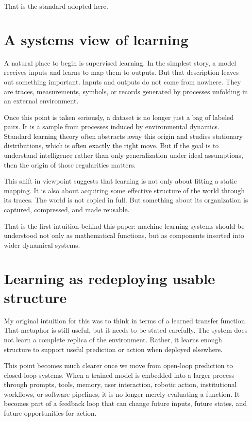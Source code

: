 \documentclass[11pt]{article}
\begin{document}
That is the standard adopted here.

\section{A systems view of learning}

A natural place to begin is supervised learning. In the simplest story, a model receives inputs and learns to map them to outputs. But that description leaves out something important. Inputs and outputs do not come from nowhere. They are traces, measurements, symbols, or records generated by processes unfolding in an external environment.

Once this point is taken seriously, a dataset is no longer just a bag of labeled pairs. It is a sample from processes induced by environmental dynamics. Standard learning theory often abstracts away this origin and studies stationary distributions, which is often exactly the right move. But if the goal is to understand intelligence rather than only generalization under ideal assumptions, then the origin of those regularities matters.

This shift in viewpoint suggests that learning is not only about fitting a static mapping. It is also about acquiring some effective structure of the world through its traces. The world is not copied in full. But something about its organization is captured, compressed, and made reusable.

That is the first intuition behind this paper: machine learning systems should be understood not only as mathematical functions, but as components inserted into wider dynamical systems.

\section{Learning as redeploying usable structure}

My original intuition for this was to think in terms of a learned transfer function. That metaphor is still useful, but it needs to be stated carefully. The system does not learn a complete replica of the environment. Rather, it learns enough structure to support useful prediction or action when deployed elsewhere.

This point becomes much clearer once we move from open-loop prediction to closed-loop systems. When a trained model is embedded into a larger process through prompts, tools, memory, user interaction, robotic action, institutional workflows, or software pipelines, it is no longer merely evaluating a function. It becomes part of a feedback loop that can change future inputs, future states, and future opportunities for action.
\end{document}
